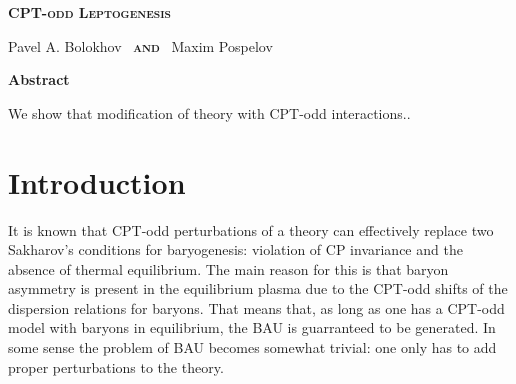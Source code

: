 \documentclass[12pt]{revtex4}
\begin{document}
\begin{titlepage}
\renewcommand{\thefootnote}{\fnsymbol{footnote}}

\vspace*{3.0cm}
\begin{center}
{\Large
  \textbf{
  \textsc{CPT-odd Leptogenesis}
         }
      }

\vspace*{1.0cm}
  {\large {}\selectfont Pavel A. Bolokhov~ 
        {\normalsize\bf \textsc{and}} ~Maxim Pospelov}

\vspace*{1.5cm}
{\large\bf Abstract}
\end{center}

        We show that modification of theory with CPT-odd interactions..

\end{titlepage}

%
%
\section{Introduction}

%
%
%
%
%
%


	It is known that CPT-odd perturbations of a theory can effectively
	replace two Sakharov's conditions for baryogenesis: violation of CP
	invariance and the absence of thermal equilibrium.
	The main reason for this is that baryon asymmetry is present in the
	equilibrium plasma due to the CPT-odd shifts of the dispersion relations
	for baryons.
	That means that, as long as one has a CPT-odd model with baryons in equilibrium,
	the BAU is guarranteed to be generated.
	In some sense the problem of BAU becomes somewhat trivial: one only has
	to add proper perturbations to the theory.
	
\end{document}
